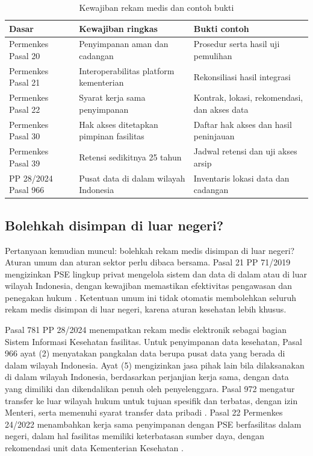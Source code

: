 \begin{table}[!htb]
  \centering\small
  \caption{Kewajiban rekam medis dan contoh bukti}\label{tab:ch03-kesehatan}
  \begin{tabularx}{\textwidth}{|>{\raggedright\arraybackslash}p{}|>{\raggedright\arraybackslash}X|>{\raggedright\arraybackslash}X|}
    \hline
    \textbf{Dasar} & \textbf{Kewajiban ringkas} & \textbf{Bukti contoh} \\ \hline
    Permenkes Pasal 20 & Penyimpanan aman dan cadangan & Prosedur serta hasil uji pemulihan \\
    \hline
    Permenkes Pasal 21 & Interoperabilitas platform kementerian & Rekonsiliasi hasil integrasi \\
    \hline
    Permenkes Pasal 22 & Syarat kerja sama penyimpanan & Kontrak, lokasi, rekomendasi, dan akses
    data \\ \hline
    Permenkes Pasal 30 & Hak akses ditetapkan pimpinan fasilitas & Daftar hak akses dan hasil
    peninjauan \\ \hline
    Permenkes Pasal 39 & Retensi sedikitnya 25 tahun & Jadwal retensi dan uji akses arsip \\ \hline
    PP 28/2024 Pasal 966 & Pusat data di dalam wilayah Indonesia & Inventaris lokasi data dan
    cadangan \\ \hline
  \end{tabularx}
\end{table}

\subsection*{Bolehkah disimpan di luar negeri?}

Pertanyaan kemudian muncul: bolehkah rekam medis disimpan di luar negeri? Aturan umum dan aturan
sektor perlu dibaca bersama. Pasal 21 PP 71/2019 mengizinkan PSE lingkup privat mengelola sistem
dan data di dalam atau di luar wilayah Indonesia, dengan kewajiban memastikan efektivitas
pengawasan dan penegakan hukum \cite{pp71-2019-pste}. Ketentuan umum ini tidak otomatis
membolehkan seluruh rekam medis disimpan di luar negeri, karena aturan kesehatan lebih khusus.

Pasal 781 PP 28/2024 menempatkan rekam medis elektronik sebagai bagian Sistem Informasi Kesehatan
fasilitas. Untuk penyimpanan data kesehatan, Pasal 966 ayat (2) menyatakan pangkalan data berupa
pusat data yang berada di dalam wilayah Indonesia. Ayat (5) mengizinkan jasa pihak lain bila
dilaksanakan di dalam wilayah Indonesia, berdasarkan perjanjian kerja sama, dengan data yang
dimiliki dan dikendalikan penuh oleh penyelenggara. Pasal 972 mengatur transfer ke luar wilayah
hukum untuk tujuan spesifik dan terbatas, dengan izin Menteri, serta memenuhi syarat transfer
data pribadi \cite{pp28-2024-kesehatan}. Pasal 22 Permenkes 24/2022 menambahkan kerja sama
penyimpanan dengan PSE berfasilitas dalam negeri, dalam hal fasilitas memiliki keterbatasan sumber
daya, dengan rekomendasi unit data Kementerian Kesehatan \cite{permenkes24-2022}.

